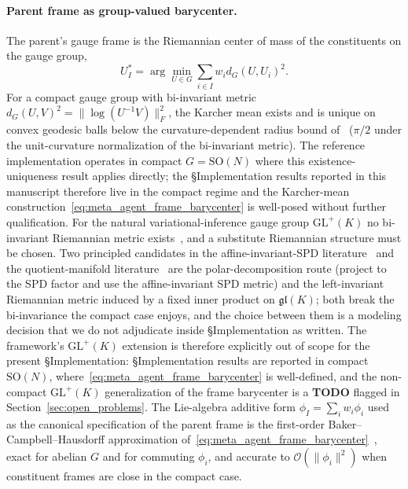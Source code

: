 \documentclass[11pt]{article}
\begin{document}
\paragraph{Parent frame as group-valued barycenter.} The parent's gauge frame is the Riemannian center of mass of the constituents on the gauge group,
\begin{equation}
U_I^* = \arg\min_{U \in G} \sum_{i \in I} w_i d_G(U, U_i)^2.
\label{eq:meta_agent_frame_barycenter}
\end{equation}
For a compact gauge group with bi-invariant metric $d_G(U, V)^2 = \|\log(U^{-1}V)\|_F^2$, the Karcher mean exists and is unique on convex geodesic balls below the curvature-dependent radius bound of~\cite{Karcher1977, Pennec2009} ($\pi/2$ under the unit-curvature normalization of the bi-invariant metric). The reference implementation operates in compact $G = \mathrm{SO}(N)$ where this existence-uniqueness result applies directly; the §Implementation results reported in this manuscript therefore live in the compact regime and the Karcher-mean construction~\eqref{eq:meta_agent_frame_barycenter} is well-posed without further qualification. For the natural variational-inference gauge group $\mathrm{GL}^+(K)$ no bi-invariant Riemannian metric exists~\cite{Milnor1976}, and a substitute Riemannian structure must be chosen. Two principled candidates in the affine-invariant-SPD literature~\cite{PennecFillardAyache2006} and the quotient-manifold literature~\cite{BonnabelSepulchre2009} are the polar-decomposition route (project to the SPD factor and use the affine-invariant SPD metric) and the left-invariant Riemannian metric induced by a fixed inner product on $\mathfrak{gl}(K)$; both break the bi-invariance the compact case enjoys, and the choice between them is a modeling decision that we do not adjudicate inside §Implementation as written. The framework's $\mathrm{GL}^+(K)$ extension is therefore explicitly out of scope for the present §Implementation: §Implementation results are reported in compact $\mathrm{SO}(N)$, where~\eqref{eq:meta_agent_frame_barycenter} is well-defined, and the non-compact $\mathrm{GL}^+(K)$ generalization of the frame barycenter is a \textbf{TODO} flagged in Section~\ref{sec:open_problems}. The Lie-algebra additive form $\phi_I = \sum_i w_i \phi_i$ used as the canonical specification of the parent frame is the first-order Baker--Campbell--Hausdorff approximation of~\eqref{eq:meta_agent_frame_barycenter}~\cite{Hall2015}, exact for abelian $G$ and for commuting $\phi_i$, and accurate to $\mathcal{O}(\|\phi_i\|^2)$ when constituent frames are close in the compact case.
\end{document}
